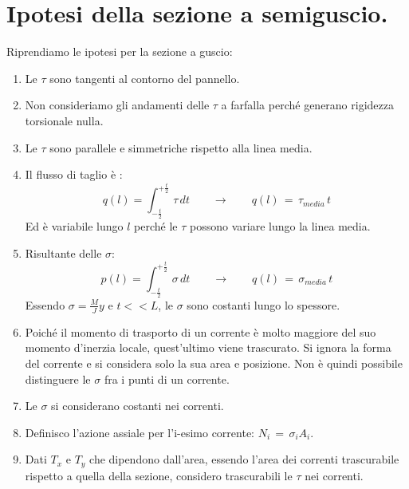 \section{Ipotesi della sezione a semiguscio.}

Riprendiamo le ipotesi per la sezione a guscio:
\begin{enumerate}
    \item Le $\tau$ sono tangenti al contorno del pannello.\\
    \item Non consideriamo gli andamenti delle $\tau$ a farfalla perché generano rigidezza torsionale nulla.\\
    \item Le $\tau$ sono parallele e simmetriche rispetto alla linea media.\\
    \item Il flusso di taglio è :
    \begin{equation*}
            q(l) = \int_{-\frac{t}{2}}^{+\frac{t}{2}} \, \tau \,dt  \quad\quad\rightarrow\quad\quad q(l) \,= \, \tau_{media} \,t
        \end{equation*}
       Ed è variabile lungo $l$ perché le $\tau$ possono variare lungo la linea media.\\
    \item Risultante delle $\sigma$:
    \begin{equation*}
            p(l) = \int_{-\frac{t}{2}}^{+\frac{t}{2}} \, \sigma \,dt  \quad\quad\rightarrow\quad\quad q(l) \,= \, \sigma_{media} \,t
        \end{equation*}
        Essendo $\sigma = \frac{M}{J}y$ e $t<<L$, le $\sigma $ sono costanti lungo lo spessore.\\
    \item Poiché il momento di trasporto di un corrente è molto maggiore del suo momento d'inerzia locale, quest'ultimo viene trascurato. Si ignora la forma del corrente e si considera solo la sua area e posizione. Non è quindi possibile distinguere le $\sigma$ fra i punti di un corrente.\\
    \item Le $\sigma $ si considerano costanti nei correnti.
    \item Definisco l'azione assiale per l'i-esimo corrente: $N_i\,=\,\sigma_iA_i$.\\
    \item Dati $T_x$ e $T_y$ che dipendono dall'area, essendo l'area dei correnti trascurabile rispetto a quella della sezione, considero trascurabili le $\tau$ nei correnti.     
\end{enumerate}

